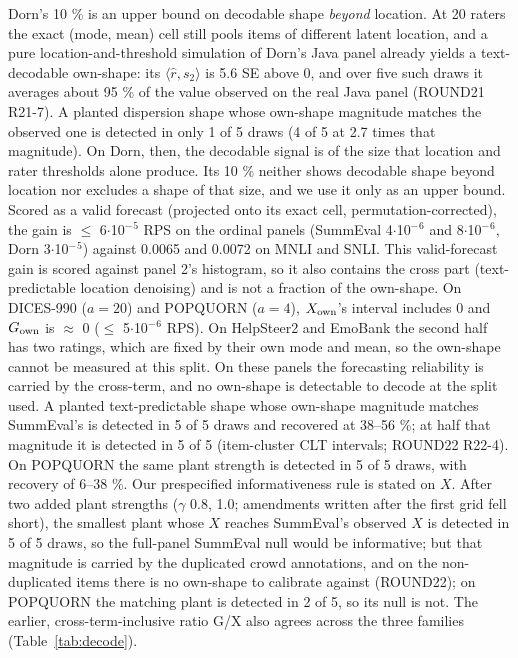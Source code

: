 \documentclass{article}
\begin{document}
Dorn's 10 \% is an upper bound on decodable shape \emph{beyond} location. At 20 raters the exact (mode, mean) cell still pools items of different latent location, and a pure location-and-threshold simulation of Dorn's Java panel already yields a text-decodable own-shape: its \(\langle\hat r, s_2\rangle\) is 5.6 SE above 0, and over five such draws it averages about 95 \% of the value observed on the real Java panel (ROUND21 R21-7). A planted dispersion shape whose own-shape magnitude matches the observed one is detected in only 1 of 5 draws (4 of 5 at 2.7 times that magnitude). On Dorn, then, the decodable signal is of the size that location and rater thresholds alone produce. Its 10 \% neither shows decodable shape beyond location nor excludes a shape of that size, and we use it only as an upper bound. Scored as a valid forecast (projected onto its exact cell, permutation-corrected), the gain is $\leq$ 6$\cdot$10$^{-}$$^{5}$ RPS on the ordinal panels (SummEval 4$\cdot$10$^{-}$$^{6}$ and 8$\cdot$10$^{-}$$^{6}$, Dorn 3$\cdot$10$^{-}$$^{5}$) against 0.0065 and 0.0072 on MNLI and SNLI. This valid-forecast gain is scored against panel 2's histogram, so it also contains the cross part (text-predictable location denoising) and is not a fraction of the own-shape. On DICES-990 (\(a=20\)) and POPQUORN (\(a=4\)), \(X_{\rm own}\)'s interval includes 0 and \(G_{\rm own}\) is $\approx$ 0 ($\leq$ 5$\cdot$10$^{-}$$^{6}$ RPS). On HelpSteer2 and EmoBank the second half has two ratings, which are fixed by their own mode and mean, so the own-shape cannot be measured at this split. On these panels the forecasting reliability is carried by the cross-term, and no own-shape is detectable to decode at the split used. A planted text-predictable shape whose own-shape magnitude matches SummEval's is detected in 5 of 5 draws and recovered at 38--56 \%; at half that magnitude it is detected in 5 of 5 (item-cluster CLT intervals; ROUND22 R22-4). On POPQUORN the same plant strength is detected in 5 of 5 draws, with recovery of 6--38 \%. Our prespecified informativeness rule is stated on \(X\). After two added plant strengths ($\gamma$ 0.8, 1.0; amendments written after the first grid fell short), the smallest plant whose \(X\) reaches SummEval's observed \(X\) is detected in 5 of 5 draws, so the full-panel SummEval null would be informative; but that magnitude is carried by the duplicated crowd annotations, and on the non-duplicated items there is no own-shape to calibrate against (ROUND22); on POPQUORN the matching plant is detected in 2 of 5, so its null is not. The earlier, cross-term-inclusive ratio G/X also agrees across the three families (Table~\ref{tab:decode}).
\end{document}
